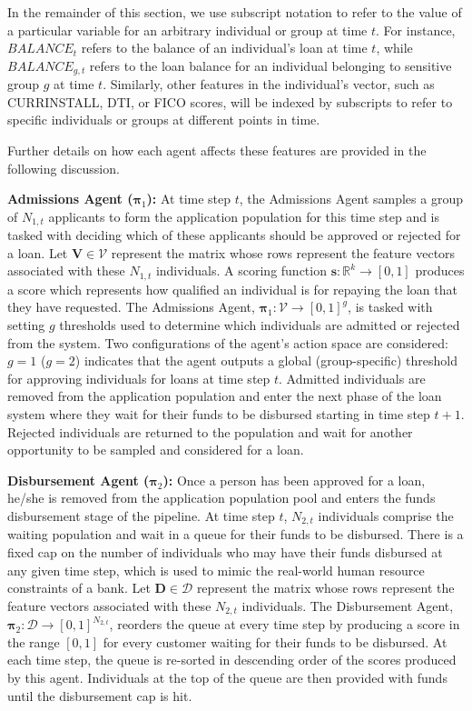In the remainder of this section, we use subscript notation to refer to the value of a particular variable for an arbitrary individual or group at time $t$. For instance, $BALANCE_t$ refers to the balance of an individual's loan at time $t$, while $BALANCE_{g,t}$ refers to the loan balance for an individual belonging to sensitive group $g$ at time $t$. Similarly, other features in the individual’s vector, such as CURRINSTALL, DTI, or FICO scores, will be indexed by subscripts to refer to specific individuals or groups at different points in time.

Further details on how each agent affects these features are provided in the following discussion.

\textbf{Admissions Agent ($\boldsymbol{\pi}_1$):} At time step $t$, the Admissions Agent samples a group of $N_{1,t}$ applicants to form the application population for this time step and is tasked with deciding which of these applicants should be approved or rejected for a loan. Let $\mathbf{V}\in\mathcal{V}$ represent the matrix whose rows represent the feature vectors associated with these $N_{1,t}$ individuals. A scoring function $\mathbf{s}:\mathbb{R}^k\rightarrow [0,1]$ produces a score which represents how qualified an individual is for repaying the loan that they have requested. The Admissions Agent, $\boldsymbol{\pi}_1: \mathcal{V} \rightarrow [0,1]^{g}$, is tasked with setting $g$ thresholds used to determine which individuals are admitted or rejected from the system. Two configurations of the agent's action space are considered: $g=1$ ($g=2$) indicates that the agent outputs a global (group-specific) threshold for approving individuals for loans at time step $t$. Admitted individuals are removed from the application population and enter the next phase of the loan system where they wait for their funds to be disbursed starting in time step $t+1$. Rejected individuals are returned to the population and wait for another opportunity to be sampled and considered for a loan.

\textbf{Disbursement Agent ($\boldsymbol{\pi}_2$):} Once a person has been approved for a loan, he/she is removed from the application population pool and enters the funds disbursement stage of the pipeline. At time step $t$, $N_{2,t}$ individuals comprise the waiting population and wait in a queue for their funds to be disbursed. There is a fixed cap on the number of individuals who may have their funds disbursed at any given time step, which is used to mimic the real-world human resource constraints of a bank. Let $\mathbf{D}\in\mathcal{D}$ represent the matrix whose rows represent the feature vectors associated with these $N_{2,t}$ individuals. The Disbursement Agent, $\boldsymbol{\pi}_2:\mathcal{D}\rightarrow[0,1]^{N_{2,t}}$, reorders the queue at every time step by producing a score in the range $[0,1]$ for every customer waiting for their funds to be disbursed. At each time step, the queue is re-sorted in descending order of the scores produced by this agent. Individuals at the top of the queue are then provided with funds until the disbursement cap is hit.

